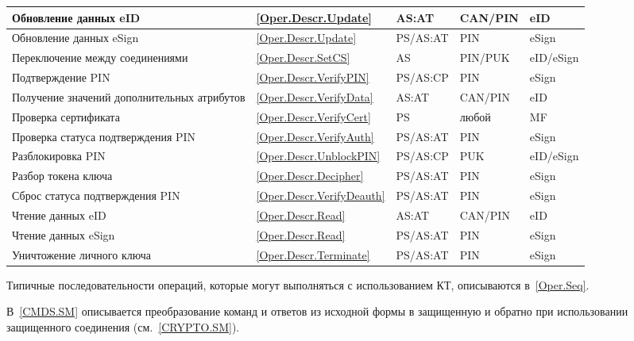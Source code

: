 \begin{table}[p]
\begin{tabular}{|p{7.5cm}|p{1.3cm}|p{2.6cm}|p{1.8cm}| p{1.7cm}|}
\hline
%
Обновление данных eID & \ref{Oper.Descr.Update} & AS:AT & CAN/PIN & eID \\
\hline
%
Обновление данных eSign & \ref{Oper.Descr.Update} & PS/AS:AT & PIN & eSign \\
\hline
%
Переключение между соединениями & \ref{Oper.Descr.SetCS} & AS & PIN/PUK & eID/eSign \\
\hline
%
Подтверждение PIN & \ref{Oper.Descr.VerifyPIN} & PS/AS:CP & PIN & eSign \\
\hline
%
Получение значений дополнительных атрибутов & \ref{Oper.Descr.VerifyData}& AS:AT & CAN/PIN & eID \\
\hline
%
Проверка сертификата & \ref{Oper.Descr.VerifyCert} & PS & любой & MF \\
\hline
%
Проверка статуса подтверждения PIN & \ref{Oper.Descr.VerifyAuth} & PS/AS:AT & PIN & eSign \\
\hline
%
Разблокировка PIN & \ref{Oper.Descr.UnblockPIN} & PS/AS:CP  & PUK & eID/eSign \\
\hline
%
Разбор токена ключа & \ref{Oper.Descr.Decipher} & PS/AS:AT & PIN & eSign \\
\hline
%
Сброс статуса подтверждения PIN & \ref{Oper.Descr.VerifyDeauth} & PS/AS:AT  & PIN & eSign \\
\hline
%
Чтение данных eID & \ref{Oper.Descr.Read} & AS:AT & CAN/PIN & eID \\
\hline
%
Чтение данных eSign & \ref{Oper.Descr.Read} & PS/AS:AT& PIN & eSign \\
\hline
%
Уничтожение личного ключа & \ref{Oper.Descr.Terminate} & PS/AS:AT  & PIN & eSign \\
\hline
\end{tabular}
\end{table}

Типичные последовательности операций, которые могут выполняться 
с использованием КТ, описываются в~\ref{Oper.Seq}.

В~\ref{CMDS.SM} описывается преобразование команд и ответов из исходной формы в 
защищенную и обратно при использовании защищенного соединения (см.~\ref{CRYPTO.SM}). 


